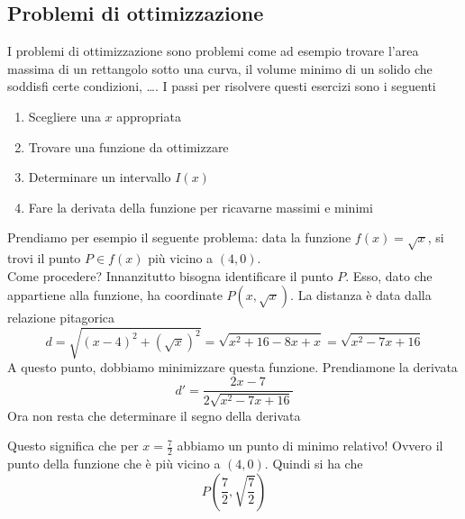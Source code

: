 \subsection{Problemi di ottimizzazione}
I problemi di ottimizzazione sono problemi come ad esempio trovare l'area massima di un rettangolo
sotto una curva, il volume minimo di un solido che soddisfi certe condizioni, \ldots. I passi per
risolvere questi esercizi sono i seguenti
\begin{enumerate}
  \item Scegliere una $x$ appropriata
  \item Trovare una funzione da ottimizzare
  \item Determinare un intervallo $I(x)$
  \item Fare la derivata della funzione per ricavarne massimi e minimi
\end{enumerate}
Prendiamo per esempio il seguente problema: data la funzione $f(x)=\sqrt{x}$, si trovi il punto 
$P\in f(x)$ più vicino a $(4,0)$.\\
Come procedere? Innanzitutto bisogna identificare il punto $P$. Esso, dato che appartiene alla 
funzione, ha coordinate $P(x,\sqrt{x})$. La distanza è data dalla relazione pitagorica
\begin{equation*}
  d = \sqrt{(x-4)^2+(\sqrt{x})^2} = \sqrt{x^2+16-8x+x}= \sqrt{x^2-7x+16} 
\end{equation*}
A questo punto, dobbiamo minimizzare questa funzione. Prendiamone la derivata
\begin{equation*}
  d' = \frac{2x-7}{2\sqrt{x^2-7x+16}}
\end{equation*}
Ora non resta che determinare il segno della derivata
\begin{center}
\end{center}
Questo significa che per $x=\frac{7}{2}$ abbiamo un punto di minimo relativo! Ovvero il punto della
funzione che è più vicino a $(4,0)$. Quindi si ha che
\begin{equation*}
  P \left( \frac{7}{2}, \sqrt{\frac{7}{2}}  \right)
\end{equation*}

